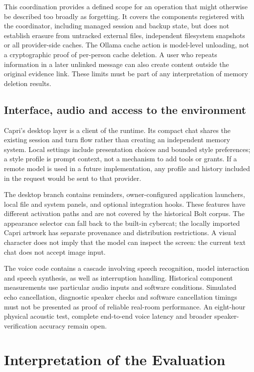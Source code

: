 \documentclass[11pt]{article}
\begin{document}
This coordination provides a defined scope for an operation that might otherwise be described too broadly as forgetting. It covers the components registered with the coordinator, including managed session and backup state, but does not establish erasure from untracked external files, independent filesystem snapshots or all provider-side caches. The Ollama cache action is model-level unloading, not a cryptographic proof of per-person cache deletion. A user who repeats information in a later unlinked message can also create content outside the original evidence link. These limits must be part of any interpretation of memory deletion results.

\subsection{Interface, audio and access to the environment}
Capri's desktop layer is a client of the runtime. Its compact chat shares the existing session and turn flow rather than creating an independent memory system. Local settings include presentation choices and bounded style preferences; a style profile is prompt context, not a mechanism to add tools or grants. If a remote model is used in a future implementation, any profile and history included in the request would be sent to that provider.

The desktop branch contains reminders, owner-configured application launchers, local file and system panels, and optional integration hooks. These features have different activation paths and are not covered by the historical Bolt corpus. The appearance selector can fall back to the built-in cybercat; the locally imported Capri artwork has separate provenance and distribution restrictions. A visual character does not imply that the model can inspect the screen: the current text chat does not accept image input.

The voice code contains a cascade involving speech recognition, model interaction and speech synthesis, as well as interruption handling. Historical component measurements use particular audio inputs and software conditions. Simulated echo cancellation, diagnostic speaker checks and software cancellation timings must not be presented as proof of reliable real-room performance. An eight-hour physical acoustic test, complete end-to-end voice latency and broader speaker-verification accuracy remain open.

\section{Interpretation of the Evaluation}
\end{document}
